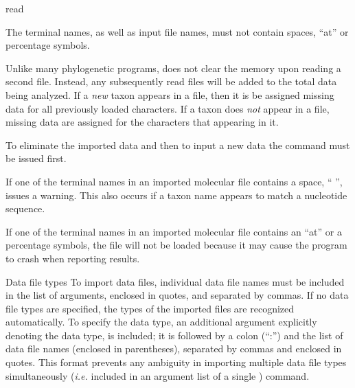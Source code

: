 \begin{command}{read}{}
\begin{poydescription}
\begin{statement}
            The terminal names, as well as input file names, must not contain
            spaces, ``at'' or percentage symbols.
        \end{statement}
          
        \begin{statement}
            Unlike many phylogenetic programs, \poy does not clear the memory
            upon reading a second file. Instead, any subsequently read files
            will be added to the total data being analyzed.  If a \emph{new} taxon
            appears in a file, then it is be assigned missing data for all
            previously loaded characters. If a taxon does \emph{not} appear in a
            file, missing data are assigned for the characters that appearing in it. 
            
            To eliminate the imported data and then to input a new data
            the  command must be issued
            first. 
        \end{statement}
        
        \begin{statement}
             If one of the terminal names in an imported molecular file contains
             a space, `` '', \poy issues a warning. This also occurs if a
             taxon name appears to match a nucleotide sequence.

             If one of the terminal names in an imported molecular file contains
             an ``at'' or a percentage symbols, the file will not be loaded because
             it may cause the program to crash when reporting results.
        \end{statement}
	\end{poydescription}

	\begin{arguments}

	  \begin{argumentgroup}{Data file types}
	  To import data files, individual data file names must be included in the list of
	   arguments, enclosed in quotes, and separated
	  by commas. If no data file types are specified, the types of the imported
	  files are recognized automatically. To specify the data type,
	  an additional argument explicitly denoting the data type,
	  is included; it is followed by a colon (``:'') and the
	  list of data file names (enclosed in parentheses), separated by commas and enclosed in quotes. This
	  format prevents any ambiguity in importing multiple data file types
	  simultaneously (\emph{i.e.} included in an argument list of a single )
	  command.


\end{argumentgroup}
\end{arguments}
\end{command}
